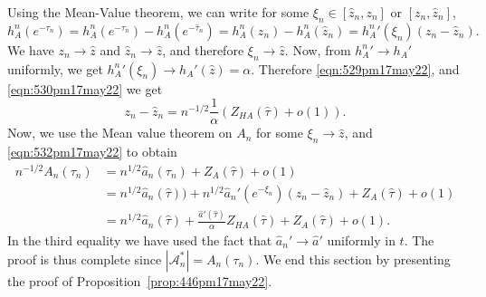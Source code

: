 \documentclass[11pt]{article}
\newcommand{\cA}{\mathcal{A}}
\begin{document}
Using the Mean-Value theorem, we can write for some $\xi_n \in [\widehat{z}_n,z_n ]$ or $[z_n,\widehat{z}_n ]$,
\begin{equation}
\label{eqn:530pm17may22}
h_A^n(e^{-\tau_n})=h_A^n(e^{-\tau_n}) - h_A^n(e^{-\widehat{\tau}_n}) = h_A^n(z_n) - h_A^n(\widehat{z}_n) = {h_A^n}'(\xi_n)(z_n - \widehat{z}_n).
\end{equation}
We have $z_n\to \widehat{z}$ and $\widehat{z}_n\to \widehat{z}$, and therefore $\xi_n \to \widehat{z}$. Now, from ${h_A^n}' \to {h_A}'$ uniformly, we get ${h_A^n}'(\xi_n)\to {h_A}'(\widehat{z})=\alpha $. Therefore \eqref{eqn:529pm17may22}, and \eqref{eqn:530pm17may22} we get
\begin{equation}
    \label{eqn:532pm17may22}
    z_n-\widehat{z}_n = n^{-1/2}\frac{1}{\alpha} \left(Z_{HA}(\widehat{\tau})+o(1)\right).
\end{equation}
Now, we use the Mean value theorem on $A_n$ for some $\xi_n \to \widehat{z}$, and \eqref{eqn:532pm17may22} to obtain
\begin{equation}
    \label{eqn:552pm17may22}
    \begin{aligned}
    n^{-1/2}A_n(\tau_n)&= n^{1/2}\widehat{a}_n(\tau_n)+ Z_A(\widehat{\tau})+o(1) \\
    &= n^{1/2}\widehat{a}_n(\widehat{\tau})) + n^{1/2}{\widehat{a}_n}'(e^{-\xi_n})(z_n - \widehat{z}_n)+ Z_A(\widehat{\tau})+o(1) \\
    &= n^{1/2}\widehat{a}_n(\widehat{\tau}) + \frac{{\widehat{a}'}(\widehat{\tau})}{\alpha} Z_{HA}(\widehat{\tau})+ Z_A(\widehat{\tau})+o(1).
    \end{aligned}
\end{equation}
In the third equality we have used the fact that ${\widehat{a}_n}' \to {\widehat{a}}'$ uniformly in $t$. The proof is thus complete since $|\cA^*_n|= A_n(\tau_n)$. We end this section by presenting the proof of Proposition~\ref{prop:446pm17may22}.
\end{document}
